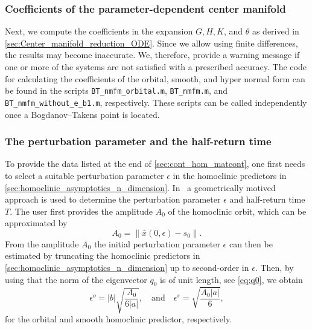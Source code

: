 \subsubsection{Coefficients of the parameter-dependent center manifold}
Next, we compute the coefficients in the expansion $G, H, K$, and $\theta$ as
derived in \cref{sec:Center_manifold_reduction_ODE}. Since we allow
using finite differences, the results may become inaccurate. We, therefore,
provide a warning message if one or more of the systems are not satisfied with
a prescribed accuracy. The code for calculating the coefficients of the
orbital, smooth, and hyper normal form can be found in the scripts
\texttt{BT_nmfm_orbital.m}, \texttt{BT_nmfm.m}, and
\texttt{BT_nmfm_without_e_b1.m}, respectively. These scripts can be
called independently once a Bogdanov--Takens point is located.

\subsubsection{The perturbation parameter and the half-return time}
To provide the data listed at the end of \cref{sec:cont_hom_matcont}, one first
needs to select a suitable perturbation parameter $\epsilon$ in the homoclinic
predictors in \cref{sec:homoclinic_asymptotics_n_dimension}.
In~\cite{Al-Hdaibat2016} a geometrically motived approach is used to determine
the perturbation parameter $\epsilon$ and half-return time $T$. The user first
provides the amplitude $A_0$ of the homoclinic orbit, which can be approximated
by
\begin{equation*}
    A_0 = \|\bar x(0,\epsilon)-s_0\|.
\end{equation*}
From the amplitude $A_0$ the initial perturbation parameter $\epsilon$ can then
be estimated by truncating the homoclinic predictors in
\cref{sec:homoclinic_asymptotics_n_dimension} up to second-order in $\epsilon$.
Then, by using that the norm of the eigenvector $q_0$ is of unit length, see
\cref{eq:q0}, we obtain
 \[
     \epsilon^o  = |b|\sqrt{ \frac{A_0}{6|a|}},
     \quad \mbox{and} \quad 
     \epsilon^s  = \sqrt{ \frac{A_0|a|}{6}},
\] 
for the orbital and smooth homoclinic predictor, respectively.

